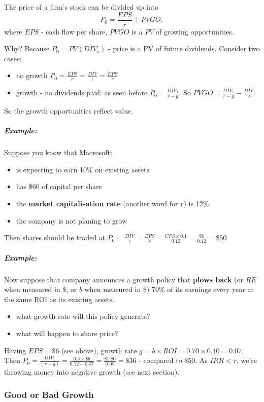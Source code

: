 \documentclass{scrartcl}
\newcommand{\example}{\subparagraph{Example:}} %
\begin{document}
The price of a firm's stock can be divided up into
$$P_0 = \frac{EPS}{r} + PVGO,$$
where $EPS$ - cash flow per share, $PVGO$ is a $PV$ of growing opportunities.

Why? Because $P_0 = PV(DIV_s)$ - price is a PV of future dividends. Consider two
cases:
\begin{itemize}
\item no growth $P_0 = \frac{EPS}r = \frac{DIV}r = \frac{EPS}r$
\item growth - no dividends paid: as seen before $P_0 = \frac{DIV_1}{r-g}$. So
  $PVGO = \frac{DIV_1}{r-g} - \frac{DIV_1}{r}$
\end{itemize}

So the growth opportunities reflect value.

\example Suppose you know that Macrosoft:
\begin{itemize}
\item is expecting to earn 10\% on existing assets
\item has \$60 of capital per share
\item the {\bf market capitalisation rate} (another word for $r$) is 12\%.
\item the company is not planing to grow
\end{itemize}
Then shares should be traded at $P_0 = \frac{DIV}{r} = \frac{EPS}{r} = \frac{CPS
  \times 0.1}{0.12} = \frac{\$6}{0.12} = \$50$

\example Now suppose that company announces a growth policy that {\bf plows
  back} (or $RE$ when measured in \$, or $b$ when measured in \$) 70\% of its
earnings every year at the same ROI as its existing assets.
\begin{itemize}
\item what growth rate will this policy generate?
\item what will happen to share price?
\end{itemize}

Having $EPS = \$6$ (see above), growth rate $g = b \times ROI = 0.70 \times 0.10
= 0.07$. Then $P_0 = \frac{DIV_1}{(r-g)}=\frac{0.3 \times \$6}{0.12-0.07} =
\frac{\$1.80}{0.05} = \$36$ - compared to \$50. As $IRR < r$, we're throwing
money into negative growth (see next section).

\subsubsection{Good or Bad Growth}
\label{sec:GoodOrBadGrowth}
\end{document}
